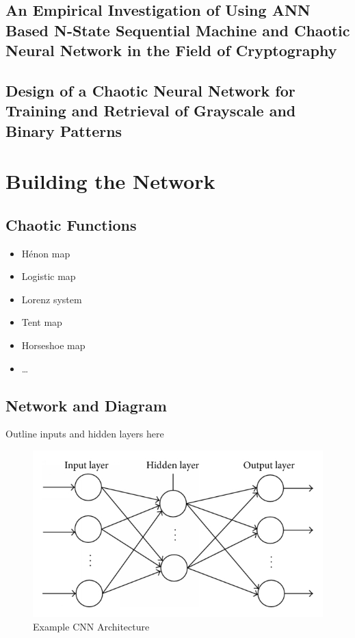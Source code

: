 \documentclass[conference]{IEEEtran}
\begin{document}
\subsection{\textbf{An Empirical Investigation of Using ANN Based N-State Sequential Machine and Chaotic Neural Network in the Field of Cryptography}}\label{subsec:an-empirical-investigation-of-using-ann-based-n-state-sequential-machine-and-chaotic-neural-network-in-the-field-of-cryptography}
\cite{Shukla2012}

\subsection{\textbf{Design of a Chaotic Neural Network for Training and Retrieval of Grayscale and Binary Patterns}}\label{subsec:design-of-a-chaotic-neural-network-for-training-and-retrieval-of-grayscale-and-binary-patterns}
\cite{TAHERKHANI20112824}

\section{Building the Network}\label{sec:building-the-network}

\subsection{Chaotic Functions}\label{subsec:chaotic-functions}

\begin{itemize}
    \item Hénon map
    \item Logistic map
    \item Lorenz system
    \item Tent map
    \item Horseshoe map
    \item \ldots
\end{itemize}

\subsection{Network and Diagram}\label{subsec:network-and-diagram}

Outline inputs and hidden layers here

\begin{figure}[!ht]
    \centering
    \includegraphics{figures/CNN}
    \caption{Example CNN Architecture}
    \label{fig:CNN}
\end{figure}
\end{document}
